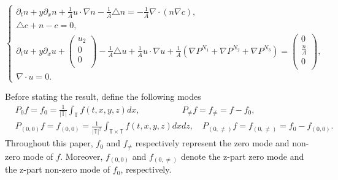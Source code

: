 \documentclass[12pt, reqno]{amsart}
\numberwithin{equation}{section}
\begin{document}
\begin{equation}\label{ini11}
	\left\{
	\begin{array}{lr}
		\partial_tn+y\partial_x n+\frac{1}{A}u\cdot\nabla n-\frac{1}{A}\triangle n=-\frac{1}{A}\nabla\cdot(n\nabla c), \\
		\triangle c+n-c=0, \\
		\partial_tu+y\partial_x u+\left(
		\begin{array}{c}
			u_2 \\
			0 \\
			0 \\
		\end{array}
		\right)
		-\frac{1}{A}\triangle u+\frac{1}{A}u\cdot\nabla u+\frac{1}{A}(\nabla P^{N_1}+\nabla P^{N_2}+\nabla P^{N_3})=\left(
		\begin{array}{c}
			0 \\
			\frac{n}{A} \\
			0 \\
		\end{array}
		\right), \\
		{\nabla \cdot u=0.}
	\end{array}
	\right.
\end{equation}



Before stating the result,  define the following modes
\begin{equation*}
	\begin{aligned}
		&P_0f=f_0=\frac{1}{|\mathbb{T}|}\int_{\mathbb{T}}f(t,x,y,z)dx,~~~\qquad
		\qquad \
		P_{\neq}f=f_{\neq}=f-f_0,\\
		&P_{(0,0)}f=f_{(0,0)}=\frac{1}{|\mathbb{T}|^2}\int_{\mathbb{T}\times\mathbb{T}}
		f(t,x,y,z)dxdz,\quad
		P_{(0,\neq)}f=f_{(0,\neq)}=f_0-f_{(0,0)}.
	\end{aligned}
\end{equation*} 
Throughout this paper, $f_0$ and $f_{\neq}$ respectively  represent the zero mode and non-zero mode  of $f$. Moreover, $f_{(0,0)}$ and $f_{(0,\neq)}$ denote the z-part zero mode and the z-part non-zero mode of $f_0$,
respectively.
\end{document}
